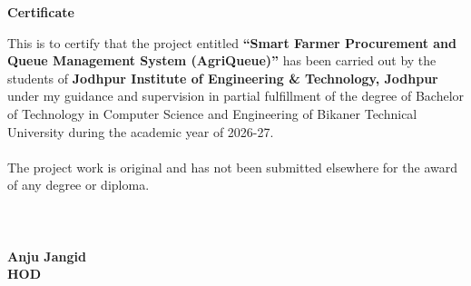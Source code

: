 \begin{center}
{\Large \bf Certificate}\\
\end{center}
\vspace{10pt}
This is to certify that the project entitled \textbf{``Smart Farmer Procurement and Queue Management System (AgriQueue)''} has been carried out by the students of \textbf{Jodhpur Institute of Engineering \& Technology, Jodhpur} under my guidance and supervision in partial fulfillment of the degree of Bachelor of Technology in Computer Science and Engineering of Bikaner Technical University during the academic year of 2026-27.\\~\\

\noindent The project work is original and has not been submitted elsewhere for the award of any degree or diploma.
\\~\\
\\~\\

 \hfill{\textbf{Anju Jangid}}\\
 \hfill{\textbf{HOD}}
\\~\\
\\~\\

\newpage

